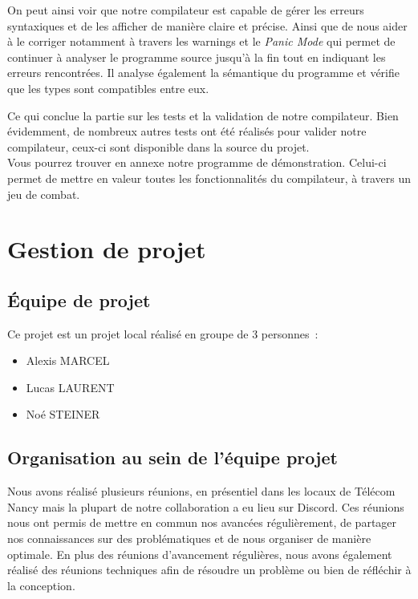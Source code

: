 \documentclass[french,a4paper]{article}
\begin{document}
    On peut ainsi voir que notre compilateur est capable de gérer les erreurs syntaxiques et de les afficher de manière claire et précise.
    Ainsi que de nous aider à le corriger notamment à travers les warnings et le \textit{Panic Mode} qui permet de continuer à analyser le programme source jusqu'à la fin tout en indiquant les erreurs rencontrées.
    Il analyse également la sémantique du programme et vérifie que les types sont compatibles entre eux.


    Ce qui conclue la partie sur les tests et la validation de notre compilateur.
    Bien évidemment, de nombreux autres tests ont été réalisés pour valider notre compilateur, ceux-ci sont disponible dans la source du projet. \\

    Vous pourrez trouver en annexe notre programme de démonstration. Celui-ci permet de mettre en valeur toutes les fonctionnalités du compilateur, à travers un jeu de combat.
    \section{Gestion de projet}\label{sec:gestion-de-projet}

    \subsection{Équipe de projet}\label{subsec:equipe-de-projet}
    Ce projet est un projet local réalisé en groupe de 3 personnes~:
    \begin{itemize}
        \item Alexis MARCEL
        \item Lucas LAURENT
        \item Noé STEINER
    \end{itemize}

    \subsection{Organisation au sein de l’équipe projet}\label{subsec:organisation-au-sein-de-lequipe-projet}
    Nous avons réalisé plusieurs réunions, en présentiel dans les locaux de Télécom Nancy mais la plupart de notre collaboration a eu lieu sur Discord.
    Ces réunions nous ont permis de mettre en commun nos avancées régulièrement, de partager nos connaissances sur des problématiques et de nous organiser de manière optimale.
    En plus des réunions d'avancement régulières, nous avons également réalisé des réunions techniques afin de résoudre un problème ou bien de réfléchir à la conception.
\end{document}
